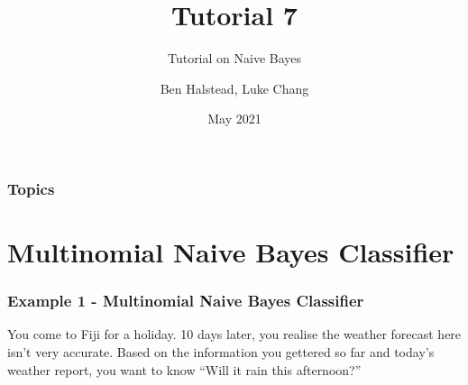 \documentclass[aspectratio=169, 10pt]{beamer}
\title{Tutorial 7}
\subtitle{Tutorial on Naive Bayes}
\author{Ben Halstead, Luke Chang}
\institute{The University of Auckland}
\date{May 2021}
\begin{document}
\frame{\titlepage}

\begin{frame}
    \frametitle{Topics}

    \tableofcontents
        
\end{frame}

\section{Multinomial Naive Bayes Classifier}
\begin{frame}[t]
\frametitle{Example 1 - Multinomial Naive Bayes Classifier}
    \begin{example}
        You come to Fiji for a holiday. 10 days later, you realise the weather forecast here isn't very accurate.
        Based on the information you gettered so far and today's weather report, you want to know ``Will it rain this afternoon?''
    \end{example}


\end{frame}
\end{document}
